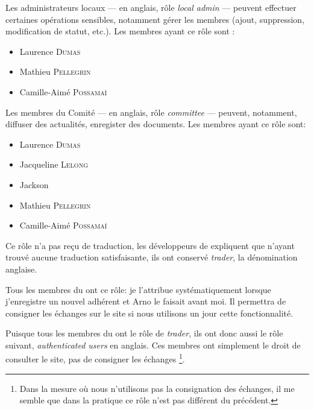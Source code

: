 \label{sec:adminLocal}

Les administrateurs locaux --- en anglais, rôle \emph{local admin} --- peuvent effectuer certaines opérations sensibles, notamment gérer les membres (ajout, suppression, modification de statut, etc.). Les membres ayant ce rôle sont :

\begin{itemize}
    \item Laurence \textsc{Dumas}
    \item Mathieu \textsc{Pellegrin}
    \item Camille-Aimé \textsc{Possamaï}
\end{itemize}

\label{sec:comite}

Les membres du Comité --- en anglais, rôle \emph{committee} ---  peuvent, notamment, diffuser des actualités, enregister des documents. Les membres ayant ce rôle sont:

\begin{itemize}
    \item Laurence \textsc{Dumas}
    \item Jacqueline \textsc{Lelong}
    \item Jackson 
    \item Mathieu \textsc{Pellegrin}
    \item Camille-Aimé \textsc{Possamaï}
\end{itemize}

\label{sec:trader}

Ce rôle n'a pas reçu de traduction, les développeurs de \CF expliquent que n'ayant trouvé aucune traduction satisfaisante, ils ont conservé  \emph{trader}, la dénomination anglaise.

Tous les membres du \CdS ont ce rôle: je l'attribue systématiquement lorsque j'enregistre un nouvel adhérent et Arno le faisait avant moi. Il permettra de consigner les échanges sur le site si nous utilisons un jour cette fonctionnalité.


Puisque tous les membres du \CdS ont le rôle de \emph{trader}, ils ont donc aussi le rôle suivant, \emph{authenticated users} en anglais. Ces membres ont simplement le droit de consulter le site, pas de consigner les échanges%
\footnote{Dans la mesure où nous n'utilisons pas la consignation des échanges, il me semble que dans la pratique ce rôle n'est pas différent du précédent.}.

